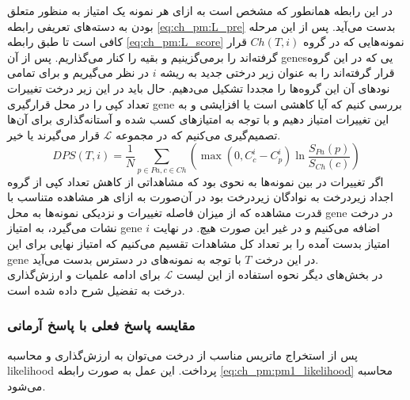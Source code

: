 در این رابطه همانطور که مشخص است به ازای هر نمونه یک امتیاز به منظور متعلق بودن به دسته‌های تعریفی رابطه \ref{eq:ch_pm:L_pre} بدست می‌آید. پس از این مرحله کافی است تا طبق رابطه \ref{eq:ch_pm:L_score} نمونه‌هایی که در گروه $Ch(T, i)$ قرار گرفته‌اند را برمی‌گزینیم و بقیه را کنار می‌گذاریم. پس از آن \glspl{gene}یی که در این گروه قرار گرفته‌اند را به عنوان زیر درختی جدید به ریشه $i$ در نظر می‌گیریم و برای تمامی نودهای آن این گروه‌ها را مجددا تشکیل می‌دهیم. حال باید در این زیر درخت تغییرات تعداد کپی را در محل قرارگیری \gls{gene} بررسی کنیم که آیا کاهشی است یا افزایشی و به این تغییرات امتیاز دهیم و با توجه به امتیازهای کسب شده و آستانه‌گذاری برای آن‌ها تصمیم‌گیری می‌کنیم که در مجموعه $\mathcal{L}$ قرار می‌گیرند یا خیر.
\begin{equation}
	DPS(T, i) = \frac{1}{N}\sum_{p\in Pa, c\in Ch} \left( \max\left( {0, C_c^i-C_p^i}\right)  \ln\frac{S_{Pa}(p)}{S_{Ch}(c)} \right)
	\label{eq:ch_pm:L_score}
\end{equation}
اگر تغییرات در بین نمونه‌ها به نحوی بود که مشاهداتی از کاهش تعداد کپی از گروه اجداد زیردرخت به نوادگان زیردرخت بود در آن‌صورت به ازای هر مشاهده متناسب با قدرت مشاهده که از میزان فاصله تغییرات و نزدیکی نمونه‌ها به محل \gls{gene} در درخت نشات می‌گیرد، به امتیاز \gls{gene} $i$ اضافه می‌کنیم و در غیر این صورت هیچ. در نهایت امتیاز بدست آمده را بر تعداد کل مشاهدات تقسیم می‌کنیم که امتیاز نهایی برای این \gls{gene} در این درخت $T$ با توجه به نمونه‌های در دسترس بدست می‌آید.
\\
در بخش‌های دیگر نحوه استفاده از این لیست $\mathcal{L}$ برای ادامه علمیات و ارزش‌گذاری درخت به تفضیل شرح داده شده است.


\subsubsection{مقایسه پاسخ فعلی با پاسخ آرمانی}
پس از استخراج ماتریس مناسب از درخت می‌توان به ارزش‌گذاری و محاسبه \gls{likelihood} پرداخت. این عمل به صورت رابطه \ref{eq:ch_pm:pm1_likelihood} محاسبه می‌شود. 

